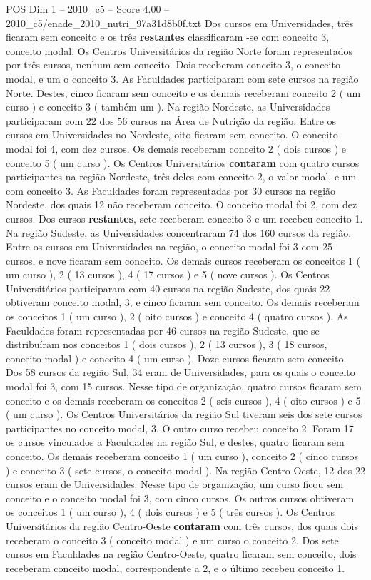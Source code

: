 \begin{textsample}{POS Dim 1 – 2010\_c5 – Score 4.00 – 2010\_c5/enade\_2010\_nutri\_97a31d8b0f.txt}
Dos cursos em Universidades, três ficaram sem conceito e os três \textbf{restantes} classificaram -se com conceito 3, conceito modal.
Os Centros Universitários da região Norte foram representados por três cursos, nenhum sem conceito.
Dois receberam conceito 3, o conceito modal, e um o conceito 3.
As Faculdades participaram com sete cursos na região Norte.
Destes, cinco ficaram sem conceito e os demais receberam conceito 2 ( um curso ) e conceito 3 ( também um ).
Na região Nordeste, as Universidades participaram com 22 dos 56 cursos na Área de Nutrição da região.
Entre os cursos em Universidades no Nordeste, oito ficaram sem conceito.
O conceito modal foi 4, com dez cursos.
Os demais receberam conceito 2 ( dois cursos ) e conceito 5 ( um curso ).
Os Centros Universitários \textbf{contaram} com quatro cursos participantes na região Nordeste, três deles com conceito 2, o valor modal, e um com conceito 3.
As Faculdades foram representadas por 30 cursos na região Nordeste, dos quais 12 não receberam conceito.
O conceito modal foi 2, com dez cursos.
Dos cursos \textbf{restantes}, sete receberam conceito 3 e um recebeu conceito 1.
Na região Sudeste, as Universidades concentraram 74 dos 160 cursos da região.
Entre os cursos em Universidades na região, o conceito modal foi 3 com 25 cursos, e nove ficaram sem conceito.
Os demais cursos receberam os conceitos 1 ( um curso ), 2 ( 13 cursos ), 4 ( 17 cursos ) e 5 ( nove cursos ).
Os Centros Universitários participaram com 40 cursos na região Sudeste, dos quais 22 obtiveram conceito modal, 3, e cinco ficaram sem conceito.
Os demais receberam os conceitos 1 ( um curso ), 2 ( oito cursos ) e conceito 4 ( quatro cursos ).
As Faculdades foram representadas por 46 cursos na região Sudeste, que se distribuíram nos conceitos 1 ( dois cursos ), 2 ( 13 cursos ), 3 ( 18 cursos, conceito modal ) e conceito 4 ( um curso ).
Doze cursos ficaram sem conceito.
Dos 58 cursos da região Sul, 34 eram de Universidades, para os quais o conceito modal foi 3, com 15 cursos.
Nesse tipo de organização, quatro cursos ficaram sem conceito e os demais receberam os conceitos 2 ( seis cursos ), 4 ( oito cursos ) e 5 ( um curso ).
Os Centros Universitários da região Sul tiveram seis dos sete cursos participantes no conceito modal, 3.
O outro curso recebeu conceito 2.
Foram 17 os cursos vinculados a Faculdades na região Sul, e destes, quatro ficaram sem conceito.
Os demais receberam conceito 1 ( um curso ), conceito 2 ( cinco cursos ) e conceito 3 ( sete cursos, o conceito modal ).
Na região Centro-Oeste, 12 dos 22 cursos eram de Universidades.
Nesse tipo de organização, um curso ficou sem conceito e o conceito modal foi 3, com cinco cursos.
Os outros cursos obtiveram os conceitos 1 ( um curso ), 4 ( dois cursos ) e 5 ( três cursos ).
Os Centros Universitários da região Centro-Oeste \textbf{contaram} com três cursos, dos quais dois receberam o conceito 3 ( conceito modal ) e um curso o conceito 2.
Dos sete cursos em Faculdades na região Centro-Oeste, quatro ficaram sem conceito, dois receberam conceito modal, correspondente a 2, e o último recebeu conceito 1.

\end{textsample}
